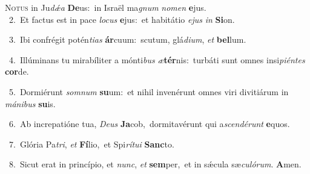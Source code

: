 \lettrine{\initial\textcolor{\initialcolor}{N}}{otus} in Ju\-\textit{dǽ}\-\textit{a} \textbf{De}\-us:~\star in Israël ma\textit{gnum} \textit{no}\-\textit{men} \textbf{e}\-jus.\\
{\numbfont\textcolor{\numbcolor}{~2.}}~Et factus est in pace \textit{lo}\-\textit{cus} \textbf{e}\-jus:~\star et habitátio \textit{e}\-\textit{jus} \textit{in} \textbf{Si}\-on.\par
{\numbfont\textcolor{\numbcolor}{~3.}}~Ibi confrégit potén\-\textit{ti}\-\textit{as} \textbf{ár}\-cuum:~\star scutum, glá\-\textit{di}\-\textit{um}, \textit{et} \textbf{bel}\-lum.\par
{\numbfont\textcolor{\numbcolor}{~4.}}~Illúminans tu mirabíliter a mónti\textit{bus} \textit{æ}\-\textbf{tér}nis:~\star turbáti sunt omnes insi\-\textit{pi}\-\textit{én}\textit{tes} \textbf{cor}\-de.\par
{\numbfont\textcolor{\numbcolor}{~5.}}~Dormiérunt \textit{som}\-\textit{num} \textbf{su}\-um:~\star et nihil invenérunt omnes viri divitiárum in \textit{má}\-\textit{ni}\textit{bus} \textbf{su}\-is.\par
{\numbfont\textcolor{\numbcolor}{~6.}}~Ab increpatióne tua, \textit{De}\-\textit{us} \textbf{Ja}\-cob,~\star dormitavérunt qui a\-\textit{scen}\-\textit{dé}\textit{runt} \textbf{e}\-quos.\par
{\numbfont\textcolor{\numbcolor}{~7.}}~Glória Pa\-\textit{tri}\-, \textit{et} \textbf{Fí}\-lio,~\star et Spi\-\textit{rí}\-\textit{tu}\textit{i} \textbf{Sanc}\-to.\par
{\numbfont\textcolor{\numbcolor}{~8.}}~Sicut erat in princípio, et \textit{nunc}\-, \textit{et} \textbf{sem}\-per,~\star et in sǽcula sæ\-\textit{cu}\-\textit{ló}\textit{rum}. \textbf{A}\-men.\par
